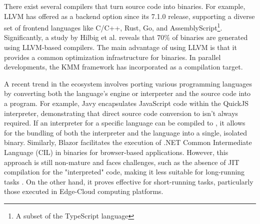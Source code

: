 \begin{minipage}[hbtp]{0.9\textwidth}
    \begin{minipage}[t]{1.0\linewidth}
    
    \end{minipage}
\end{minipage}






There exist several compilers that turn source code into \Wasm binaries. 
For example, LLVM has offered \Wasm as a backend option since its 7.1.0 release, supporting a diverse set of frontend languages like C/C++, Rust, Go, and AssemblyScript\footnote{A subset of the TypeScript language}.
Significantly, a study by Hilbig et al. reveals that 70\% of \Wasm binaries are generated using LLVM-based compilers. 
The main advantage of using LLVM is that it provides a common optimization infrastructure for \Wasm binaries.
In parallel developments, the KMM framework has incorporated \Wasm as a compilation target.


A recent trend in the \Wasm ecosystem involves porting various programming languages by converting both the language's engine or interpreter and the source code into a \Wasm program. 
For example, Javy encapsulates JavaScript code within the QuickJS interpreter, demonstrating that direct source code conversion to \Wasm isn't always required. 
If an interpreter for a specific language can be compiled to \Wasm, it allows for the bundling of both the interpreter and the language into a single, isolated \Wasm binary. 
Similarly, Blazor facilitates the execution of .NET Common Intermediate Language (CIL) in \Wasm binaries for browser-based applications. 
However, this approach is still non-mature and faces challenges, such as the absence of JIT compilation for the "interpreted" code, making it less suitable for long-running tasks \cite{10.1145/3593434.3593454}. 
On the other hand, it proves effective for short-running tasks, particularly those executed in Edge-Cloud computing platforms.

